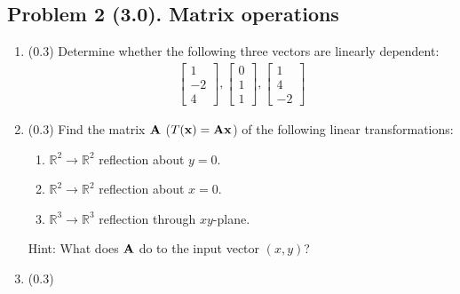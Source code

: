 \documentclass[11pt,titlepage,fleqn]{article}
\begin{document}



\subsection*{Problem 2 (3.0). Matrix operations}

\begin{enumerate}

\item (0.3) Determine whether the following three vectors are linearly dependent:
%
\begin{eqnarray*}
\left[ \begin{array}{r} 1 \\ -2 \\ 4  \end{array} \right],
\left[ \begin{array}{r} 0 \\ 1 \\ 1 \end{array} \right],
\left[ \begin{array}{r} 1 \\ 4 \\ -2 \end{array} \right]
\end{eqnarray*}


\item (0.3) Find the matrix $\mbox{${\bf A}$}$ ($T(\mbox{${\bf x}$}) = \mbox{${\bf A}$}\mbox{${\bf x}$}$) of the following linear transformations:
%
\begin{enumerate}
\item $\mathbb{R}^2 \rightarrow \mathbb{R}^2$ reflection about $y = 0$.
\item $\mathbb{R}^2 \rightarrow \mathbb{R}^2$ reflection about $x = 0$.
\item $\mathbb{R}^3 \rightarrow \mathbb{R}^3$ reflection through $xy$-plane.
\end{enumerate}
%
Hint: What does $\mbox{${\bf A}$}$ do to the input vector $(x,y)$?


\item (0.3)


\end{enumerate}
\end{document}
